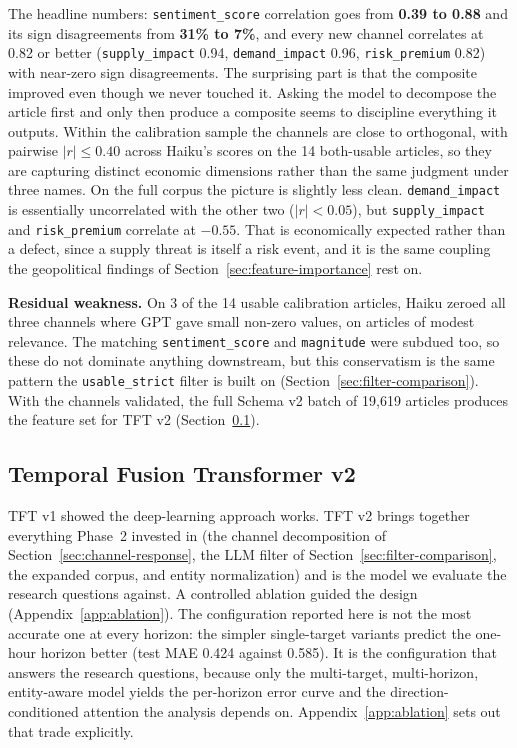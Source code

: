 The headline numbers: \texttt{sentiment\_score} correlation goes from \textbf{0.39 to 0.88} and its sign disagreements from \textbf{31\% to 7\%}, and every new channel correlates at 0.82 or better (\texttt{supply\_impact} 0.94, \texttt{demand\_impact} 0.96, \texttt{risk\_premium} 0.82) with near-zero sign disagreements. The surprising part is that the composite improved even though we never touched it. Asking the model to decompose the article first and only then produce a composite seems to discipline everything it outputs. Within the calibration sample the channels are close to orthogonal, with pairwise $\lvert r \rvert \leq 0.40$ across Haiku's scores on the 14 both-usable articles, so they are capturing distinct economic dimensions rather than the same judgment under three names. On the full corpus the picture is slightly less clean. \texttt{demand\_impact} is essentially uncorrelated with the other two ($\lvert r \rvert < 0.05$), but \texttt{supply\_impact} and \texttt{risk\_premium} correlate at $-0.55$. That is economically expected rather than a defect, since a supply threat is itself a risk event, and it is the same coupling the geopolitical findings of Section~\ref{sec:feature-importance} rest on.

\textbf{Residual weakness.} On 3 of the 14 usable calibration articles, Haiku zeroed all three channels where GPT gave small non-zero values, on articles of modest relevance. The matching \texttt{sentiment\_score} and \texttt{magnitude} were subdued too, so these do not dominate anything downstream, but this conservatism is the same pattern the \texttt{usable\_strict} filter is built on (Section~\ref{sec:filter-comparison}). With the channels validated, the full Schema v2 batch of 19{,}619 articles produces the feature set for TFT v2 (Section~\ref{sec:tft-v2}).

\subsection{Temporal Fusion Transformer v2}\label{sec:tft-v2}

TFT v1 showed the deep-learning approach works. TFT v2 brings together everything Phase~2 invested in (the channel decomposition of Section~\ref{sec:channel-response}, the LLM filter of Section~\ref{sec:filter-comparison}, the expanded corpus, and entity normalization) and is the model we evaluate the research questions against. A controlled ablation guided the design (Appendix~\ref{app:ablation}). The configuration reported here is not the most accurate one at every horizon: the simpler single-target variants predict the one-hour horizon better (test MAE 0.424 against 0.585). It is the configuration that answers the research questions, because only the multi-target, multi-horizon, entity-aware model yields the per-horizon error curve and the direction-conditioned attention the analysis depends on. Appendix~\ref{app:ablation} sets out that trade explicitly.


